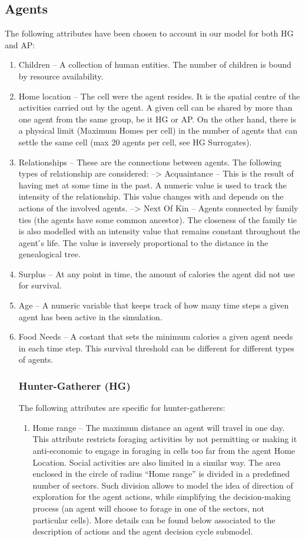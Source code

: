 \subsection{Agents}
The following attributes have been chosen to account in our model for both HG and AP:

\begin{enumerate}

\item Children – A collection of human entities. The number of children is bound by resource
availability.
\item Home location – The cell were the agent resides. It is the spatial centre of the activities
carried out by the agent. A given cell can be shared by more than one agent from the same
group, be it HG or AP. On the other hand, there is a physical limit (Maximum Homes per
cell) in the number of agents that can settle the same cell (max 20 agents per cell, see HG
Surrogates).
\item Relationships – These are the connections between agents. The following types of
relationship are considered:
--> Acquaintance – This is the result of having met at some time in the past. A numeric
value is used to track the intensity of the relationship. This value changes with and
depends on the actions of the involved agents.
--> Next Of Kin – Agents connected by family ties (the agents have some common
ancestor). The closeness of the family tie is also modelled with an intensity value that
remains constant throughout the agent ́s life. The value is inversely proportional to the
distance in the genealogical tree.
\item Surplus – At any point in time, the amount of calories the agent did not use for survival.
\item Age – A numeric variable that keeps track of how many time steps a given agent has been
active in the simulation.
\item Food Needs – A costant that sets the minimum calories a given agent needs in each time
step. This survival threshold can be different for different types of agents.

\subsubsection{Hunter-Gatherer (HG)}
The following attributes are specific for hunter-gatherers:
\begin{enumerate}
\item Home range – The maximum distance an agent will travel in one day. This attribute restricts
foraging activities by not permitting or making it anti-economic to engage in foraging in cells
too far from the agent Home Location. Social activities are also limited in a similar way.
The area enclosed in the circle of radius “Home range” is divided in a predefined number of
sectors. Such division allows to model the idea of direction of exploration for the agent
actions, while simplifying the decision-making process (an agent will choose to forage in one
of the sectors, not particular cells). More details can be found below associated to the
description of actions and the agent decision cycle submodel.


\end{enumerate}
\end{enumerate}
